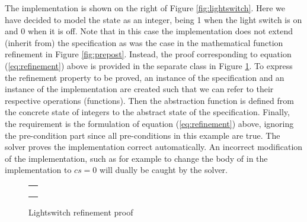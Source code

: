 The implementation is shown on the right of Figure \ref{fig:lightswitch}.
Here we have decided to model the state as an integer, being 1 when the light 
switch is on and 0 when it is off. Note that in this case the implementation
does not extend (inherit from) the specification as was the case in the 
mathematical function refinement in Figure \ref{fig:prepost}. Instead, the
proof corresponding to equation (\ref{eq:refinement}) above is provided
in the separate class  in Figure \ref{fig:lightswitch-proof}.
To express the refinement property to be proved, an instance  of the
specification and an instance  of the implementation are created such that we can refer to their respective operations (functions). Then the abstraction function  is defined from the concrete state of integers to the abstract state 
of the specification. Finally, the requirement is the \Klang{} formulation of 
equation (\ref{eq:refinement}) above, ignoring the pre-condition part since all
pre-conditions in this example are true. The \Klang{} solver proves the
implementation correct automatically. An incorrect modification of the implementation, such as for example to change the body of  in 
the implementation to $cs = 0$ will dually be caught by the solver.


\begin{figure}
\centering
\begin{tabular}{c}
\hline \\
 \\ \\
\hline
\end{tabular}
\caption{Lightswitch refinement proof}
\label{fig:lightswitch-proof}
\end{figure}
